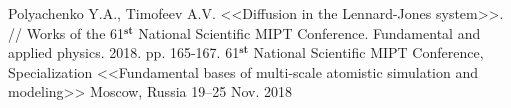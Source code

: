 \begin{cventries}
  \cventry
    {Polyachenko Y.A., Timofeev A.V. <<Diffusion in the Lennard-Jones system>>. // Works of the 61$^{\textbf{st}}$ National Scientific MIPT Conference. Fundamental and applied physics. 2018. pp. 165-167.} %
    {61$^{\textbf{st}}$ National Scientific MIPT Conference, Specialization <<Fundamental bases of multi-scale atomistic simulation and modeling>>} %
    {Moscow, Russia} %
    {19--25 Nov. 2018} %
    {
      \begin{cvitems} %
      \end{cvitems}
    }
    

\end{cventries}
